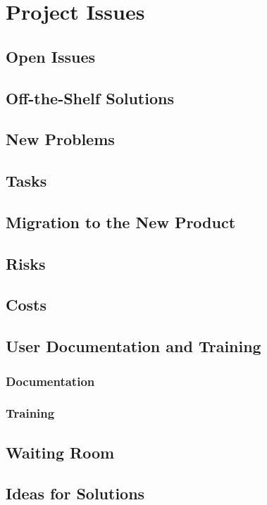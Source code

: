 \documentclass{article}
\begin{document}



\section{Project Issues}
\subsection{Open Issues}
\subsection{Off-the-Shelf Solutions}
\subsection{New Problems}
\subsection{Tasks}
\subsection{Migration to the New Product}
\subsection{Risks}
\subsection{Costs}
\subsection{User Documentation and Training}
\subsubsection{Documentation}
\subsubsection{Training}
\subsection{Waiting Room}
\subsection{Ideas for Solutions}
\end{document}
